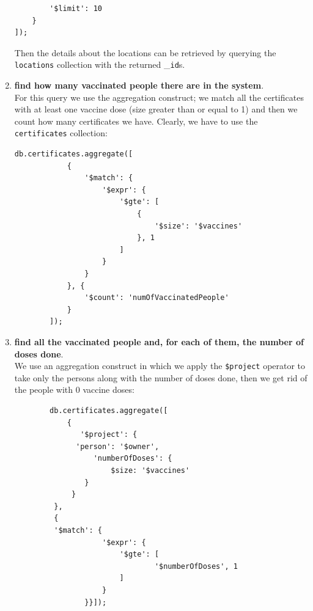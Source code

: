 \documentclass{article}
\begin{document}
\begin{enumerate}
\begin{lstlisting}
        '$limit': 10
    }
]);
    \end{lstlisting}
    Then the details about the locations can be retrieved by querying the \verb|locations| collection with the returned \_\verb|id|s.
    \item \textbf{find how many vaccinated people there are in the system}.\\
    For this query we use the aggregation construct; we match all the certificates with at least one vaccine dose (size greater than or equal to 1) and then we count how many certificates we have. Clearly, we have to use the \verb|certificates| collection:
\begin{lstlisting}
db.certificates.aggregate([
            {
                '$match': {
                    '$expr': {
                        '$gte': [
                            {
                                '$size': '$vaccines'
                            }, 1
                        ]
                    }
                }
            }, {
                '$count': 'numOfVaccinatedPeople'
            }
        ]);
\end{lstlisting}
    \item \textbf{find all the vaccinated people and, for each of them, the number of doses done}.\\
    We use an aggregation construct in which we apply the \verb|$project| operator to take only the persons along with the number of doses done, then we get rid of the people with 0 vaccine doses:
    \\
    \begin{lstlisting}
        db.certificates.aggregate([
            {
               '$project': {
              'person': '$owner',
                  'numberOfDoses': {
                      $size: '$vaccines'
                }
             }
         },
         {
         '$match': {
                    '$expr': {
                        '$gte': [
                                '$numberOfDoses', 1
                        ]
                    }
                }}]); 
    \end{lstlisting}
    \end{enumerate}
\end{document}
